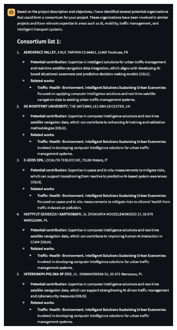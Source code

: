 \begin{figure}[h]
    \centering
    \begin{subfigure}{0.45\textwidth}
        \centering
        \includegraphics[width=.8\textwidth]{figures/implementation/example-consortium-organisations-recommendation-answer-pt1.png}
        \caption{}
        \label{fig:example-consortium-organisations-recommendation-answer-pt1}
    \end{subfigure}
    \hfill
    \begin{subfigure}{0.45\textwidth}
        \centering

\end{subfigure}
\end{figure}
